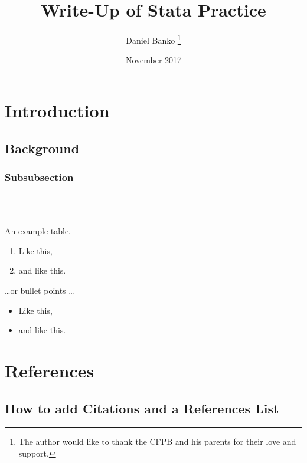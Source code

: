 \documentclass[12pt, letterpaper]{article}
\title{Write-Up of Stata Practice}
\author{Daniel Banko \thanks{The author would like to thank the CFPB and his parents for their love and support.}}
\date{November 2017}
\numberwithin{equation}{section}
\theoremstyle{definition}
\begin{document}
\begin{titlepage}
\maketitle
\end{titlepage}
\section{Introduction}
\subsection{Background}
\subsubsection{Subsubsection}
\indent
\\

\begin{figure}
\centering
\end{figure}

\begin{eqnarray*}
\end{eqnarray*}


\begin{table}

\caption{\label{tab:widgets}An example table.}
\end{table}

\begin{enumerate}
\item Like this,
\item and like this.
\end{enumerate}
\dots or bullet points \dots
\begin{itemize}
\item Like this,
\item and like this.
\end{itemize}

\section{References}
\subsection{How to add Citations and a References List}
\end{document}
